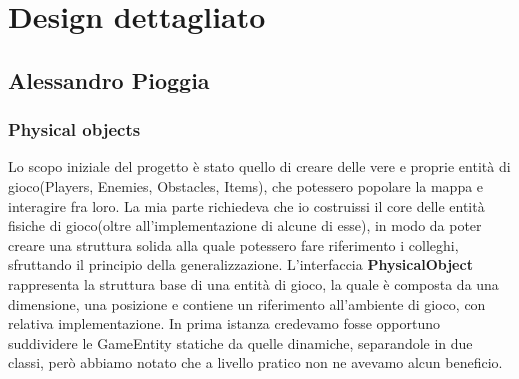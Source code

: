 \newpage

\section{Design dettagliato}

\subsection*{Alessandro Pioggia}
\subsubsection{Physical objects}
Lo scopo iniziale del progetto è stato quello di creare delle vere e proprie entità di gioco(Players, Enemies, Obstacles, Items), che potessero popolare la mappa e interagire fra loro.
La mia parte richiedeva che io costruissi il core delle entità fisiche di gioco(oltre all'implementazione di alcune di esse), in modo da poter creare una struttura solida alla quale potessero fare riferimento i colleghi, sfruttando il principio della generalizzazione.
L'interfaccia \textbf{PhysicalObject} rappresenta la struttura base di una entità di gioco, la quale è composta da una dimensione, una posizione e contiene un riferimento all'ambiente di gioco, con relativa implementazione. In prima istanza credevamo fosse opportuno suddividere le GameEntity statiche da quelle dinamiche, separandole in due classi, però abbiamo notato che a livello pratico non ne avevamo alcun beneficio. 

